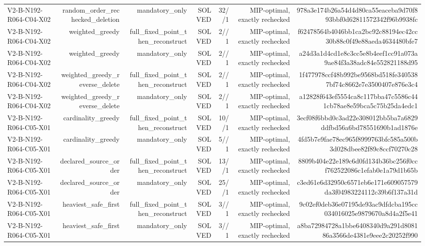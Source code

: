 {\begin{longtable}{lrrrrrr}
V2-B-N192-R064-C04-X02 & random\_order\_rechecked\_deletion & mandatory\_only & SOLVED & 32//1 & MIP-optimal, exactly rechecked & 978a3e174b26a54d4d80ca55eaceba9d70f893bbf0d62811572342f96b9938fc \\
V2-B-N192-R064-C04-X02 & weighted\_greedy & full\_fixed\_point\_then\_reconstruct & SOLVED & 2//1 & MIP-optimal, exactly rechecked & f62478564b4046bb1ca2bc92c88194ec42cc30b88c0f49e88aeda4634480bfe7 \\
V2-B-N192-R064-C04-X02 & weighted\_greedy & mandatory\_only & SOLVED & 2//1 & MIP-optimal, exactly rechecked & a24d3a1d4cd1e8c3cc5e8b4eef1cc91a073a9ae84f3a38adc84e552821188d95 \\
V2-B-N192-R064-C04-X02 & weighted\_greedy\_reverse\_delete & full\_fixed\_point\_then\_reconstruct & SOLVED & 2//1 & MIP-optimal, exactly rechecked & 1f477978ccf48b992be9568bd518fe3405387bf74c8662e7e3500407e876e3c4 \\
V2-B-N192-R064-C04-X02 & weighted\_greedy\_reverse\_delete & mandatory\_only & SOLVED & 2//1 & MIP-optimal, exactly rechecked & a12828f643ef5554ca8c117bba47c5586c441cb78ae8e59bca5c75b25da4edc1 \\
V2-B-N192-R064-C05-X01 & cardinality\_greedy & full\_fixed\_point\_then\_reconstruct & SOLVED & 10//1 & MIP-optimal, exactly rechecked & 3ecf08f6bbd0c3ad22e308012bb5ba7a6829ddfbd56a6bd78551690b1ad1876e \\
V2-B-N192-R064-C05-X01 & cardinality\_greedy & mandatory\_only & SOLVED & 5//1 & MIP-optimal, exactly rechecked & 4fd5b7e9fae78ec965f8999763bfc585a500b3d028dbee82f89c8ccf70270c28 \\
V2-B-N192-R064-C05-X01 & declared\_source\_order & full\_fixed\_point\_then\_reconstruct & SOLVED & 13//1 & MIP-optimal, exactly rechecked & 8809b404e22e189c6d0fd134b36bc256f0ccf762522086c1efab0e1a79d1b65b \\
V2-B-N192-R064-C05-X01 & declared\_source\_order & mandatory\_only & SOLVED & 25//1 & MIP-optimal, exactly rechecked & c3ed61e6d32950c6571eb6e171e609057579da3f04983224112c39b6f137a31d \\
V2-B-N192-R064-C05-X01 & heaviest\_safe\_first & full\_fixed\_point\_then\_reconstruct & SOLVED & 3//1 & MIP-optimal, exactly rechecked & 9c02ef0deb36e07195de93ac9dfdcba195cc034016025e9879670a8d4a2f5e41 \\
V2-B-N192-R064-C05-X01 & heaviest\_safe\_first & mandatory\_only & SOLVED & 3//1 & MIP-optimal, exactly rechecked & a8ba72984728a1bbe6408340d9a291d808186a3566de4381e9eee2c20252f990 \\

\end{longtable}}
